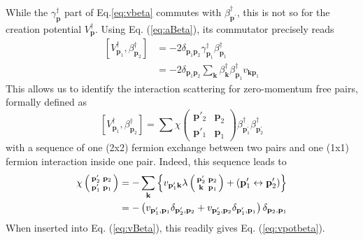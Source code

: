 \documentclass[epj]{svjour}
\newcommand{\vk}{\ensuremath{\mathbf{k}}}
\newcommand{\vp}{\ensuremath{\mathbf{p}}}
\begin{document}
While the $\gamma^{\dagger}_\vp$ part of Eq.\eqref{eq:vbeta} 
commutes with $%
\beta^{\dagger}_{\vp ^\prime}$, 
this is not so for the creation potential $%
V^{\dagger}_\vp$. Using Eq. (\ref{eq:aBeta}), its commutator precisely reads 
\begin{equation}\begin{split}  \label{eq:vpotbeta}
\left[V^{\dagger}_{\mathbf{p} _1},\beta^{\dagger}_{\mathbf{p} _2}\right] 
&=-2\delta_{\mathbf{p} _1\mathbf{p} _2}\gamma^{\dagger}_{\mathbf{p}
_1}\beta^{\dagger}_{\mathbf{p} _1}\\
&=-2\delta_{\mathbf{p} _1\mathbf{p} _2}\sum_\mathbf{k}\beta^{\dagger}_{\mathbf{k}}\beta^{\dagger}_{\mathbf{p} _1}v_{\mathbf{k}\mathbf{p} _1}
\end{split}\end{equation}
This allows us to identify the interaction scattering for zero-momentum free pairs,
formally defined as \cite{CobosonPhysicsReports}
\begin{equation}  \label{eq:vBeta}
\left[V^{\dagger}_{\mathbf{p} _1},\beta^{\dagger}_{\mathbf{p} _2}\right] 
=\sum\chi\left(\begin{smallmatrix}\vp'_2&\vp_2\\\vp'_1&\vp_1\end{smallmatrix}%
\right)  \beta^{\dagger}_{\mathbf{p} ^{\prime}_1}\beta^{\dagger}_{\mathbf{p}
^{\prime}_2}
\end{equation}
with a sequence of one (2x2) fermion exchange between two pairs and one (1x1) fermion interaction inside one pair. Indeed, this sequence leads to
\begin{equation}  \label{eq:interactSc}
\begin{split}
\chi\left(\begin{smallmatrix}\vp'_2&\vp_2\\\vp'_1&\vp_1\end{smallmatrix}%
\right)  &=-\sum_\vk\left\{v_{\mathbf{p} ^{\prime}_1\mathbf{k} }\lambda\left(%
\begin{smallmatrix}\vp'_2&\vp_2\\\vk&\vp_1\end{smallmatrix}\right)  +\left(%
\mathbf{p} ^{\prime}_1\leftrightarrow\mathbf{p} ^{\prime}_2\right) \right\} 
\\
&=-\left(v_{\mathbf{p} ^{\prime}_1,\mathbf{p} _1}\delta_{\mathbf{p}
^{\prime}_2,\mathbf{p} _2}+v_{\mathbf{p} ^{\prime}_2,\mathbf{p} _2}\delta_{%
\mathbf{p} ^{\prime}_1,\mathbf{p} _1}\right) \delta_{\mathbf{p} _2,\mathbf{p}
_1}
\end{split}%
\end{equation}
When inserted into Eq. (\ref{eq:vBeta}), this readily gives Eq. (\ref{eq:vpotbeta}). 
\end{document}
